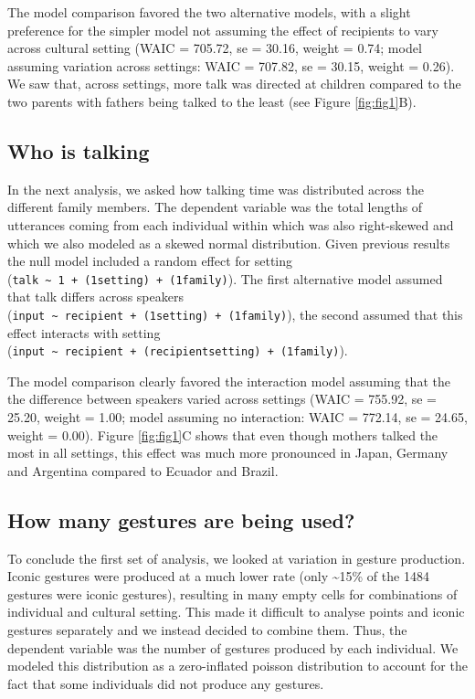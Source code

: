 \documentclass[
  man,floatsintext]{apa6}
\begin{document}
The model comparison favored the two alternative models, with a slight preference for the simpler model not assuming the effect of recipients to vary across cultural setting (WAIC = 705.72, se = 30.16, weight = 0.74; model assuming variation across settings: WAIC = 707.82, se = 30.15, weight = 0.26). We saw that, across settings, more talk was directed at children compared to the two parents with fathers being talked to the least (see Figure \ref{fig:fig1}B).

\hypertarget{who-is-talking}{%
\subsection{Who is talking}\label{who-is-talking}}

In the next analysis, we asked how talking time was distributed across the different family members. The dependent variable was the total lengths of utterances coming from each individual within which was also right-skewed and which we also modeled as a skewed normal distribution. Given previous results the null model included a random effect for setting (\texttt{talk\ \textasciitilde{}\ 1\ +\ (1\textbar{}setting)\ +\ (1\textbar{}family)}). The first alternative model assumed that talk differs across speakers (\texttt{input\ \textasciitilde{}\ recipient\ +\ (1\textbar{}setting)\ +\ (1\textbar{}family)}), the second assumed that this effect interacts with setting (\texttt{input\ \textasciitilde{}\ recipient\ +\ (recipient\textbar{}setting)\ +\ (1\textbar{}family)}).

The model comparison clearly favored the interaction model assuming that the the difference between speakers varied across settings (WAIC = 755.92, se = 25.20, weight = 1.00; model assuming no interaction: WAIC = 772.14, se = 24.65, weight = 0.00). Figure \ref{fig:fig1}C shows that even though mothers talked the most in all settings, this effect was much more pronounced in Japan, Germany and Argentina compared to Ecuador and Brazil.

\hypertarget{how-many-gestures-are-being-used}{%
\subsection{How many gestures are being used?}\label{how-many-gestures-are-being-used}}

To conclude the first set of analysis, we looked at variation in gesture production. Iconic gestures were produced at a much lower rate (only \textasciitilde15\% of the 1484 gestures were iconic gestures), resulting in many empty cells for combinations of individual and cultural setting. This made it difficult to analyse points and iconic gestures separately and we instead decided to combine them. Thus, the dependent variable was the number of gestures produced by each individual. We modeled this distribution as a zero-inflated poisson distribution to account for the fact that some individuals did not produce any gestures.
\end{document}
